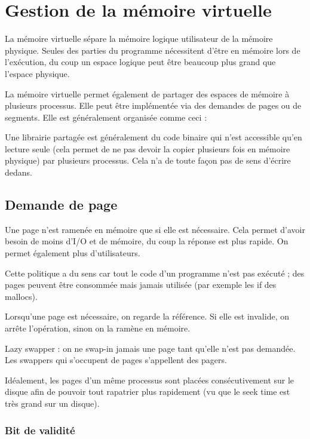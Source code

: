 \chapter{Gestion de la mémoire virtuelle}

La mémoire virtuelle sépare la mémoire logique utilisateur de la mémoire physique. Seules des parties du programme nécessitent d'être en mémoire lors de l'exécution, du coup un espace logique peut être beaucoup plus grand que l'espace physique.

La mémoire virtuelle permet également de partager des espaces de mémoire à plusieurs processus. Elle peut être implémentée via des demandes de pages ou de segments. Elle est généralement organisée comme ceci :


Une librairie partagée est généralement du code binaire qui n'est accessible qu'en lecture seule (cela permet de ne pas devoir la copier plusieurs fois en mémoire physique) par plusieurs processus. Cela n'a de toute façon pas de sens d'écrire dedans.



\section{Demande de page}

Une page n'est ramenée en mémoire que si elle est nécessaire. Cela permet d'avoir besoin de moins d'I/O et de mémoire, du coup la réponse est plus rapide. On permet également plus d'utilisateurs.

Cette politique a du sens car tout le code d'un programme n'est pas exécuté ; des pages peuvent être consommée mais jamais utilisée (par exemple les if des mallocs).

Lorsqu'une page est nécessaire, on regarde la référence. Si elle est invalide, on arrête l'opération, sinon on la ramène en mémoire.

Lazy swapper : on ne swap-in jamais une page tant qu'elle n'est pas demandée. Les swappers qui s'occupent de pages s'appellent des pagers.

Idéalement, les pages d'un même processus sont placées consécutivement sur le disque afin de pouvoir tout rapatrier plus rapidement (vu que le seek time est très grand sur un disque).


	\subsection{Bit de validité}
	
